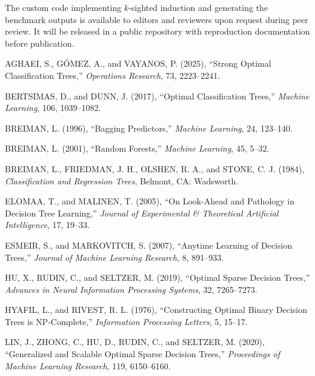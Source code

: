 \documentclass[12pt]{article}
\begin{document}
The custom code implementing $k$-sighted induction and generating the benchmark outputs is available to editors and reviewers upon request during peer review. It will be released in a public repository with reproduction documentation before publication.

\begin{thebibliography}{}

AGHAEI, S., G{\'O}MEZ, A., and VAYANOS, P. (2025),
``Strong Optimal Classification Trees,''
\emph{Operations Research}, 73, 2223--2241.

BERTSIMAS, D., and DUNN, J. (2017),
``Optimal Classification Trees,''
\emph{Machine Learning}, 106, 1039--1082.

BREIMAN, L. (1996),
``Bagging Predictors,''
\emph{Machine Learning}, 24, 123--140.

BREIMAN, L. (2001),
``Random Forests,''
\emph{Machine Learning}, 45, 5--32.

BREIMAN, L., FRIEDMAN, J. H., OLSHEN, R. A., and STONE, C. J. (1984),
\emph{Classification and Regression Trees},
Belmont, CA: Wadsworth.

ELOMAA, T., and MALINEN, T. (2005),
``On Look-Ahead and Pathology in Decision Tree Learning,''
\emph{Journal of Experimental \& Theoretical Artificial Intelligence}, 17, 19--33.

ESMEIR, S., and MARKOVITCH, S. (2007),
``Anytime Learning of Decision Trees,''
\emph{Journal of Machine Learning Research}, 8, 891--933.

HU, X., RUDIN, C., and SELTZER, M. (2019),
``Optimal Sparse Decision Trees,''
\emph{Advances in Neural Information Processing Systems}, 32, 7265--7273.

HYAFIL, L., and RIVEST, R. L. (1976),
``Constructing Optimal Binary Decision Trees is NP-Complete,''
\emph{Information Processing Letters}, 5, 15--17.

LIN, J., ZHONG, C., HU, D., RUDIN, C., and SELTZER, M. (2020),
``Generalized and Scalable Optimal Sparse Decision Trees,''
\emph{Proceedings of Machine Learning Research}, 119, 6150--6160.


\end{thebibliography}
\end{document}
